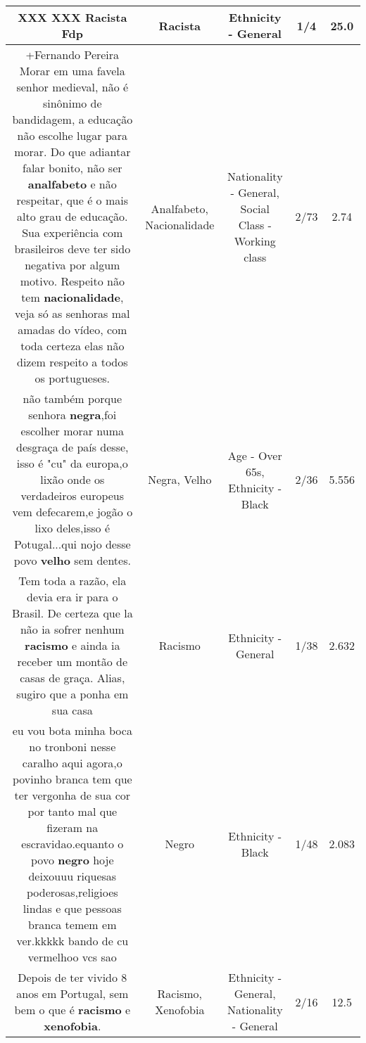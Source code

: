 \documentclass[11pt]{article}
\newlength\mylength
\begin{document}
\begin{center}
\begin{longtable}{|C{.65\mylength}|C{.30\mylength}|C{.12\mylength}|C{.12\mylength}|C{.12\mylength}|}
  \small XXX XXX \textbf{Racista} Fdp\normalsize   & Racista & Ethnicity - General & 1/4 & 25.0 \\  \hline
  \small +Fernando Pereira Morar em uma favela senhor medieval,  não é sinônimo de bandidagem, a educação não escolhe lugar para morar. Do que adiantar falar bonito, não ser \textbf{analfabeto} e não respeitar, que é o mais alto grau de educação. Sua experiência com brasileiros deve ter sido negativa por algum motivo. Respeito não tem \textbf{nacionalidade}, veja só as senhoras mal amadas do vídeo, com toda certeza elas não dizem respeito a todos os portugueses.\normalsize   & Analfabeto, Nacionalidade & Nationality - General, Social Class - Working class & 2/73 & 2.74 \\  \hline
  \small não também porque senhora \textbf{negra},foi escolher morar numa desgraça de país desse, isso é "cu" da europa,o lixão onde os verdadeiros europeus vem defecarem,e jogão o lixo deles,isso é  Potugal...qui nojo desse povo \textbf{velho} sem dentes.\normalsize   & Negra, Velho & Age - Over 65s, Ethnicity - Black & 2/36 & 5.556 \\  \hline
  \small Tem toda a razão, ela devia era ir para o Brasil. De certeza que la não ia sofrer nenhum \textbf{racismo} e ainda ia receber um montão de casas de graça. Alias, sugiro que a ponha em sua casa\normalsize   & Racismo & Ethnicity - General & 1/38 & 2.632 \\  \hline
  \small eu vou bota minha boca no tronboni nesse caralho aqui agora,o povinho branca tem que ter vergonha de sua cor por tanto mal que fizeram na escravidao.equanto  o povo \textbf{negro} hoje deixouuu riquesas poderosas,religioes lindas e que pessoas branca temem em ver.kkkkk bando de cu vermelhoo vcs sao\normalsize   & Negro & Ethnicity - Black & 1/48 & 2.083 \\  \hline
  \small Depois de ter vivido 8 anos em Portugal, sem bem o que é \textbf{racismo} e \textbf{xenofobia}.\normalsize   & Racismo, Xenofobia & Ethnicity - General, Nationality - General & 2/16 & 12.5 \\  \hline

\end{longtable}
\end{center}
\end{document}
